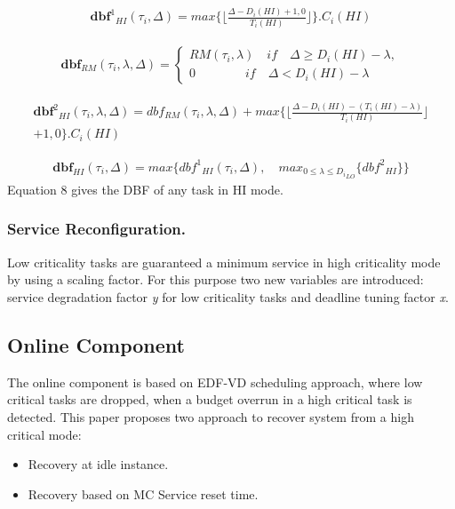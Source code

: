 \begin{equation}
\begin{aligned}
{\textbf{dbf}^1}_{HI}(\tau_i, \Delta) = max\{\lfloor \frac{\Delta - D_i(HI) + 1, 0}{T_i(HI)} \rfloor\}. C_i(HI)
\end{aligned}
\end{equation}

\begin{equation}
\begin{aligned}
\textbf{dbf}_{RM}(\tau_i,\lambda, \Delta) = \left\{\begin{matrix}
RM(\tau_i, \lambda) \quad if \quad \Delta \geq D_i(HI) - \lambda,\\ 0 \qquad \qquad if \quad \Delta < D_i(HI) - \lambda
\end{matrix}\right.
\end{aligned}
\end{equation}

\begin{equation}
\begin{aligned}
{\textbf{dbf}^2}_{HI}(\tau_i, \lambda, \Delta) = dbf_{RM}(\tau_i, \lambda, \Delta) +  max\{\lfloor \frac{\Delta - D_i(HI) - (T_i(HI) - \lambda)}{T_i(HI)} \rfloor \\+ 1, 0\}.C_i(HI) 
\end{aligned}
\end{equation}

\begin{equation}
\begin{aligned}
\textbf{dbf}_{HI}(\tau_i, \Delta) = max\{ {dbf^1}_{HI}(\tau_i, \Delta),\quad max_{0\leq\lambda\leq {D_i}_{LO}}\{{dbf^2}_{HI}\} \}
\end{aligned}
\end{equation}
Equation 8 gives the DBF of any task in HI mode.
\subsubsection{Service Reconfiguration.}
Low criticality tasks are guaranteed a minimum service in high criticality mode by using a scaling factor. For this purpose two new variables are introduced: service degradation factor \textit{y} for low criticality tasks and deadline tuning factor \textit{x}. 
\subsection{Online Component}
The online component is based on EDF-VD scheduling approach, where low critical tasks are dropped, when a budget overrun in a high critical task is detected.
This paper proposes two approach to recover system from a high critical mode:
\begin{itemize}
	\item Recovery at idle instance.
	\item Recovery based on MC Service reset time.
\end{itemize}
